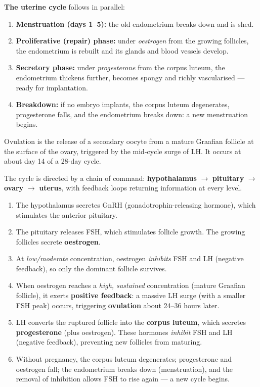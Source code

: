 \documentclass[11pt]{article}
\newcommand{\cle}[1]{{\popxbold\color{popdark}#1}}
\newcounter{popsec}
\newcounter{popsub}
\newcommand{\courssub}[1]{%
  \stepcounter{popsub}%
  \par\vspace{9pt}\noindent{\popxbold\fontsize{11.5}{13}\selectfont\color{popink}{\color{poporange}\thepopsec.\thepopsub}\hspace{6pt}#1}\par\nopagebreak\vspace{4pt}
}
\begin{document}
\textbf{The uterine cycle} follows in parallel:
\begin{enumerate}
\item \textbf{Menstruation (days 1--5):} the old endometrium breaks down and is shed.
\item \textbf{Proliferative (repair) phase:} under \emph{oestrogen} from the growing follicles, the endometrium is rebuilt and its glands and blood vessels develop.
\item \textbf{Secretory phase:} under \emph{progesterone} from the corpus luteum, the endometrium thickens further, becomes spongy and richly vascularised --- ready for implantation.
\item \textbf{Breakdown:} if no embryo implants, the corpus luteum degenerates, progesterone falls, and the endometrium breaks down: a new menstruation begins.
\end{enumerate}

\begin{definition}[Ovulation]
\cle{Ovulation} is the release of a secondary oocyte from a mature Graafian follicle at the surface of the ovary, triggered by the mid-cycle surge of LH. It occurs at about day 14 of a 28-day cycle.
\end{definition}

\courssub{Hormonal Control of the Cycle}

The cycle is directed by a chain of command: \textbf{hypothalamus} $\rightarrow$ \textbf{pituitary} $\rightarrow$ \textbf{ovary} $\rightarrow$ \textbf{uterus}, with feedback loops returning information at every level.

\begin{enumerate}
\item The hypothalamus secretes \cle{GnRH} (gonadotrophin-releasing hormone), which stimulates the anterior pituitary.
\item The pituitary releases \cle{FSH}, which stimulates follicle growth. The growing follicles secrete \textbf{oestrogen}.
\item At \emph{low/moderate} concentration, oestrogen \emph{inhibits} FSH and LH (negative feedback), so only the dominant follicle survives.
\item When oestrogen reaches a \emph{high, sustained} concentration (mature Graafian follicle), it exerts \textbf{positive feedback}: a massive \cle{LH surge} (with a smaller FSH peak) occurs, triggering \textbf{ovulation} about 24--36 hours later.
\item LH converts the ruptured follicle into the \textbf{corpus luteum}, which secretes \textbf{progesterone} (plus oestrogen). These hormones \emph{inhibit} FSH and LH (negative feedback), preventing new follicles from maturing.
\item Without pregnancy, the corpus luteum degenerates; progesterone and oestrogen fall; the endometrium breaks down (menstruation), and the removal of inhibition allows FSH to rise again --- a new cycle begins.
\end{enumerate}
\end{document}
